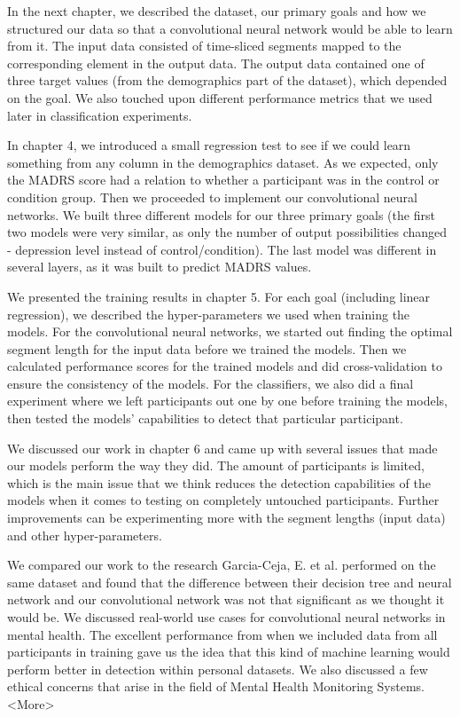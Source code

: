 In the next chapter, we described the dataset, our primary goals and how we structured our data so that a convolutional neural network would be able to learn from it. The input data consisted of time-sliced segments mapped to the corresponding element in the output data. The output data contained one of three target values (from the demographics part of the dataset), which depended on the goal. We also touched upon different performance metrics that we used later in classification experiments.

In chapter 4, we introduced a small regression test to see if we could learn something from any column in the demographics dataset. As we expected, only the MADRS score had a relation to whether a participant was in the control or condition group. Then we proceeded to implement our convolutional neural networks. We built three different models for our three primary goals (the first two models were very similar, as only the number of output possibilities changed - depression level instead of control/condition). The last model was different in several layers, as it was built to predict MADRS values. 

We presented the training results in chapter 5. For each goal (including linear regression), we described the hyper-parameters we used when training the models. For the convolutional neural networks, we started out finding the optimal segment length for the input data before we trained the models. Then we calculated performance scores for the trained models and did cross-validation to ensure the consistency of the models. For the classifiers, we also did a final experiment where we left participants out one by one before training the models, then tested the models' capabilities to detect that particular participant.

We discussed our work in chapter 6 and came up with several issues that made our models perform the way they did. The amount of participants is limited, which is the main issue that we think reduces the detection capabilities of the models when it comes to testing on completely untouched participants. Further improvements can be experimenting more with the segment lengths (input data) and other hyper-parameters. 

We compared our work to the research Garcia-Ceja, E. et al. performed on the same dataset and found that the difference between their decision tree and neural network and our convolutional network was not that significant as we thought it would be. We discussed real-world use cases for convolutional neural networks in mental health. The excellent performance from when we included data from all participants in training gave us the idea that this kind of machine learning would perform better in detection within personal datasets. We also discussed a few ethical concerns that arise in the field of Mental Health Monitoring Systems. <More>

